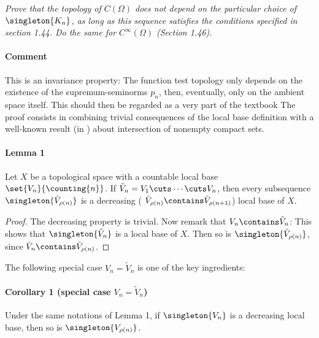 \textit{
Prove that the topology of $C(\Omega)$ does not depend on the particular 
choice of $\singleton{K_n}$, as long as this sequence satisfies the conditions 
specified in section 1.44. Do the same for $C^\infty(\Omega)$ (Section 1.46).}
%
\paragraph{Comment}This is an invariance property: 
The function test topology only depends on the existence of the 
supremum-seminorms $p_n$, then, eventually, 
only on the ambient space itself. 
This should then be regarded as a very part of the textbook \cite{FA}
%
The proof consists in combining trivial consequences of the local base 
definition with a well-known result (\eg [2.6] in \cite{BigRudin}) 
about intersection of nonempty compact sets. 

\paragraph{Lemma 1} Let $X$ be a topological space with a countable local base 
$\set{V_n}{\counting{n}}$. 
If 
%
  $\tilde{V}_{n} = V_1 \cuts \cdots \cuts V_n$, 
%
then every subsequence 
% 
  $\singleton{\tilde{V}_{\rho(n)}}$ 
%
is a decreasing (\ie 
%
  $\tilde{V}_{\rho(n)} \contains \tilde{V}_{\rho(n+1)}$)
%
local base of $X$.
%
\begin{proof}
The decreasing property is trivial. Now remark that 
%
  $V_n \contains \tilde{V}_{n}$:
%
This shows that 
%
  $\singleton{\tilde{V}_{n}}$ 
% 
is a local base of $X$. Then so is 
%
  $\singleton{\tilde{V}_{\rho(n)}}$,
% 
since $\tilde{V}_{n} \contains \tilde{V}_{\rho(n)}$.
\end{proof}
%
\noindent The following special case 
%
  $V_{n} = \tilde{V}_{n}$ 
% 
is one of the key ingredients:
\paragraph{Corollary 1 (special case $V_{n} = \tilde{V}_{n}$)}
Under the same notations of Lemma 1, if $\singleton{V_{n}}$ is a decreasing 
local base, then so is $\singleton{V_{\rho(n)}}$.
%
